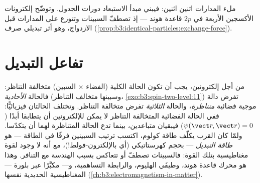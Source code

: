 \begin{omfigure}

{\small ملء المدارات اثنين اثنين: فيبني مبدأ الاستبعاد
دورات الجدول. وتوضّح إلكترونات الأكسجين الأربعة في $2p$
قاعدة هوند --- إذ تصطفّ السبينات وتتوزع على المدارات
قبل الازدواج، وهو أثر تبديلي صرف
(\cref{prop:b3:identical-particles:exchange-force}).}
\end{omfigure}

\section{تفاعل التبديل}

\begin{proposition}\label{prop:b3:identical-particles:exchange-force}
من أجل إلكترونين، يجب أن تكون الحالة الكلية (الفضاء $\times$ السبين)
متخالفة التناظر: فالحالة \emph{الأحادية} (وسبينها متخالف التناظر،
\cref{exo:b3:spin-two-level:11}) تفرض دالة موجية فضائية
\emph{متناظرة}، والحالة \emph{الثلاثية} تفرض متخالفة التناظر. وتختلف الحالتان
فيزيائيًّا: ففي الحالة الفضائية المتخالفة التناظر لا يمكن للإلكترونين
أن يتطابقا أبدًا ($\psi(\vect r, \vect r) = 0$) فيبقيان متباعدين، بينما
تدع الحالة المتناظرة لهما أن يتكدّسا. ولمّا كان القرب يكلّف طاقة
كولوم، اكتسب ترتيب السبينين فرقًا في الطاقة --- هو
\emph{طاقة التبديل} --- بحجم كهرستاتيكي (أي بالإلكترون-فولط!)،
مع أنه لا وجود لقوة مغناطيسية بتلك القوة: فالسبينات تصطفّ أو
تتعاكس بسبب الهندسة مع التنافر. وهذا هو محرك
قاعدة هوند، وطيفَي الهليوم، والرابطة التساهمية، و---
مكبَّرًا عبر بلورة --- المغناطيسية الحديدية نفسها
(\cref{ch:b3:electromagnetism-in-matter}).
\end{proposition}

